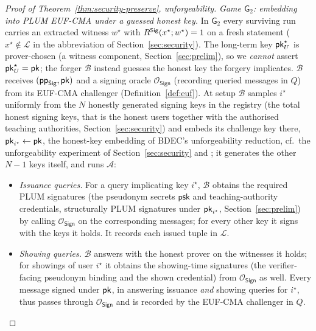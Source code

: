 \begin{proof}[Proof of Theorem~\ref{thm:security-preserve}, unforgeability]
    \smallskip\noindent\emph{Game $\mathsf G_2$: embedding into PLUM
EUF-CMA under a guessed honest key.} In $\mathsf G_2$ every surviving run carries an extracted witness $w^\star$ with $R^{\mathsf{Sig}}(x^\star;w^\star)=1$ on a fresh statement ($x^\star\notin\mathcal L$ in the abbreviation of Section~\ref{sec:security}). The long-term key $\mathsf{pk}_U^\star$ is prover-chosen (a witness component, Section~\ref{sec:prelim}), so we \emph{cannot} assert $\mathsf{pk}_U^\star=\mathsf{pk}$; the forger $\mathcal B$ instead guesses the honest key the forgery implicates. $\mathcal B$ receives $(\mathsf{pp}_{\mathsf{Sig}},\mathsf{pk})$ and a signing oracle $\mathcal O_{\mathsf{Sign}}$ (recording queried messages in $Q$) from its EUF-CMA challenger (Definition~\ref{def:euf}). At setup $\mathcal B$ samples $i^\star$ uniformly from the $N$ honestly generated signing keys in the registry (the total honest signing keys, that is the honest users together with the authorised teaching authorities, Section~\ref{sec:security}) and embeds its challenge key there, $\mathsf{pk}_{i^\star}\leftarrow\mathsf{pk}$, the honest-key embedding of BDEC's unforgeability reduction, cf.\ the unforgeability experiment of Section~\ref{sec:security} and \cite[Appendix~A.1]{10.1007/978-981-96-0957-4_3}; it generates the other $N-1$ keys itself, and runs $\mathcal A$:
    \begin{itemize}
      \item \emph{Issuance queries.} For a query implicating key $i^\star$,
      $\mathcal B$ obtains the required PLUM signatures (the pseudonym secrets
      $\mathsf{psk}$ and teaching-authority credentials, structurally PLUM
      signatures under $\mathsf{pk}_{i^\star}$, Section~\ref{sec:prelim}) by calling
      $\mathcal O_{\mathsf{Sign}}$ on the corresponding messages; for every other
      key it signs with the keys it holds. It records each issued tuple in
      $\mathcal L$.
      \item \emph{Showing queries.} $\mathcal B$ answers with the honest prover on
      the witnesses it holds; for showings of user $i^\star$ it obtains the
      showing-time signatures (the verifier-facing pseudonym binding and the
      shown credential) from $\mathcal O_{\mathsf{Sign}}$ as well. Every message
      signed under $\mathsf{pk}$, in answering issuance \emph{and} showing queries for
      $i^\star$, thus passes through $\mathcal O_{\mathsf{Sign}}$ and is recorded
      by the EUF-CMA challenger in $Q$.
    \end{itemize}

\end{proof}
